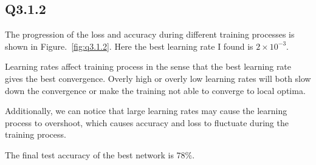 \documentclass[11pt]{article}
\begin{document}
\newpage

\subsection*{Q3.1.2}

The progression of the loss and accuracy during different training processes is shown in Figure.~\ref{fig:q3.1.2}. Here the best learning rate I found is $2\times10^{-3}$.

Learning rates affect training process in the sense that the best learning rate gives the best convergence. Overly high or overly low learning rates will both slow down the convergence or make the training not able to converge to local optima.

Additionally, we can notice that large learning rates may cause the learning process to overshoot, which causes accuracy and loss to fluctuate during the training process.

The final test accuracy of the best network is $78\%$.
\end{document}
